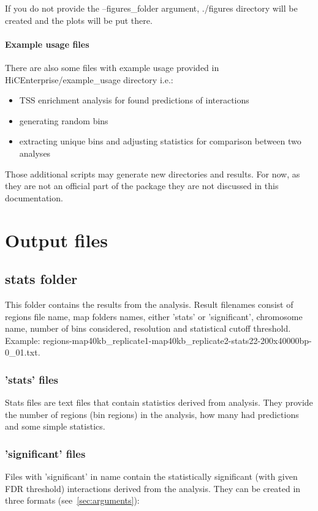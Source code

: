 If you do not provide the --figures\_folder argument, ./figures directory will be created and the plots will be put
there.

\paragraph{Example usage files}

There are also some files with example usage provided in HiCEnterprise/example\_usage directory i.e.:
\begin{itemize}
    \item TSS enrichment analysis for found predictions of interactions
    \item generating random bins
    \item extracting unique bins and adjusting statistics for comparison between two analyses
\end{itemize}

Those additional scripts may generate new directories and results. For now, as they are not an official part of the
package they are not discussed in this documentation.

\section{Output files}

\subsection{stats folder}
This folder contains the results from the analysis. Result filenames consist of regions file name, map folders names,
either 'stats' or 'significant', chromosome name, number of bins considered, resolution and statistical cutoff
threshold. Example: regions-map40kb\_replicate1-map40kb\_replicate2-stats22-200x40000bp-0\_01.txt.

\subsubsection{'stats' files}
Stats files are text files that contain statistics derived from analysis. They provide the number of regions (bin
regions) in the analysis, how many had predictions and some simple statistics.

\subsubsection{'significant' files}
Files with 'significant' in name contain the statistically significant (with given FDR threshold) interactions derived
from the analysis. They can be created in three formats (see~\ref{sec:arguments}):
